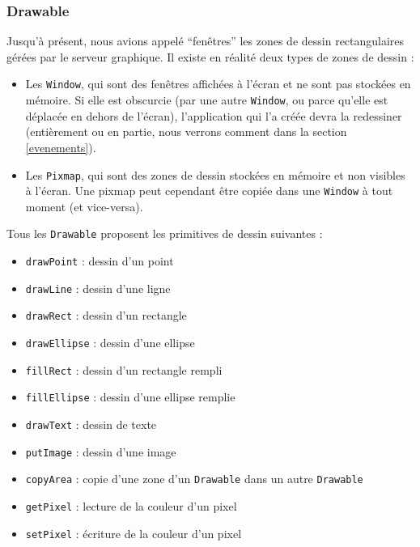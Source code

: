 \subsubsection{Drawable}

Jusqu'à présent, nous avions appelé ``fenêtres'' les zones de dessin rectangulaires gérées par le serveur graphique. Il existe en réalité deux types de zones de dessin :
\begin{itemize}
  \item Les \verb|Window|, qui sont des fenêtres affichées à l'écran et ne sont pas stockées en mémoire. Si elle est obscurcie (par une autre \verb|Window|, ou parce qu'elle est déplacée en dehors de l'écran), l'application qui l'a créée devra la redessiner (entièrement ou en partie, nous verrons comment dans la section \ref{evenements}).
  \item Les \verb|Pixmap|, qui sont des zones de dessin stockées en mémoire et non visibles à l'écran. Une pixmap peut cependant être copiée dans une \verb|Window| à tout moment (et vice-versa).
\end{itemize}

\vspace{1em}

Tous les \verb|Drawable| proposent les primitives de dessin suivantes :
\begin{itemize}
  \item \verb|drawPoint| : dessin d'un point
  \item \verb|drawLine| : dessin d'une ligne
  \item \verb|drawRect| : dessin d'un rectangle
  \item \verb|drawEllipse| : dessin d'une ellipse
  \item \verb|fillRect| : dessin d'un rectangle rempli
  \item \verb|fillEllipse| : dessin d'une ellipse remplie
  \item \verb|drawText| : dessin de texte
  \item \verb|putImage| : dessin d'une image
  \item \verb|copyArea| : copie d'une zone d'un \verb|Drawable| dans un autre \verb|Drawable|
  \item \verb|getPixel| : lecture de la couleur d'un pixel
  \item \verb|setPixel| : écriture de la couleur d'un pixel
\end{itemize}

\vspace{1em}

